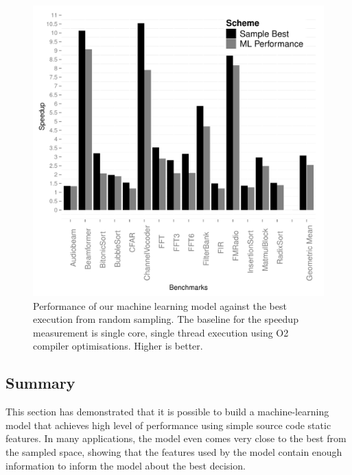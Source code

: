 \begin{figure}[t]
    \centering
    \includegraphics[width=1\textwidth]{streamit-paper/graphics/results.pdf}
    \caption{Performance of our machine learning model against the best execution from random sampling. The baseline for the speedup measurement is single core, single thread execution using O2 compiler optimisations. Higher is better.}\label{fig:results}
\end{figure}

\subsection{Summary}

This section has demonstrated that it is possible to build a machine-learning model that achieves high level of performance using simple source code static features.
In many applications, the model even comes very close to the best from the sampled space, showing that the features used by the model contain enough information to inform the model about the best decision.

\vspace{5mm}
